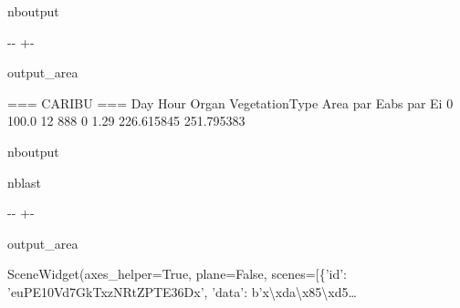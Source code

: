 \documentclass[letterpaper,10pt,english]{sphinxmanual}
\begin{document}
\begin{sphinxuseclass}{nboutput}
{

\kern-\sphinxverbatimsmallskipamount\kern-\baselineskip
\kern+\FrameHeightAdjust\kern-\fboxrule
\vspace{\nbsphinxcodecellspacing}

\begin{sphinxuseclass}{output_area}
\begin{sphinxuseclass}{}


\begin{sphinxVerbatim}[commandchars=\\\{\}]
=== CARIBU ===
     Day  Hour  Organ  VegetationType  Area    par Eabs      par Ei
0  100.0    12    888               0  1.29  226.615845  251.795383
\end{sphinxVerbatim}



\end{sphinxuseclass}
\end{sphinxuseclass}
}

\end{sphinxuseclass}
\begin{sphinxuseclass}{nboutput}
\begin{sphinxuseclass}{nblast}
{

\kern-\sphinxverbatimsmallskipamount\kern-\baselineskip
\kern+\FrameHeightAdjust\kern-\fboxrule
\vspace{\nbsphinxcodecellspacing}

\begin{sphinxuseclass}{output_area}
\begin{sphinxuseclass}{}


\begin{sphinxVerbatim}[commandchars=\\\{\}]
\llap{\color{nbsphinxout}[31]:\,\hspace{\fboxrule}\hspace{\fboxsep}}SceneWidget(axes\_helper=True, plane=False, scenes=[\{'id': 'euPE10Vd7GkTxzNRtZPTE36Dx', 'data': b'x\textbackslash{}xda\textbackslash{}x85\textbackslash{}xd5…
\end{sphinxVerbatim}



\end{sphinxuseclass}
\end{sphinxuseclass}
}

\end{sphinxuseclass}
\end{sphinxuseclass}
\end{document}
